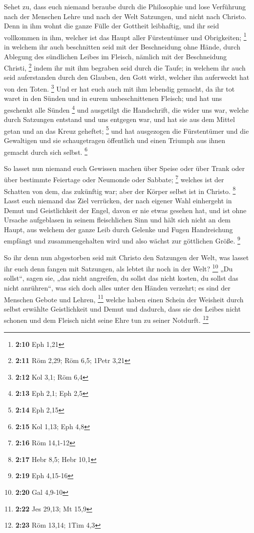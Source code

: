  Sehet zu, dass euch niemand beraube durch die Philosophie
und lose Verführung nach der Menschen Lehre und nach der Welt Satzungen,
und nicht nach Christo.  Denn in ihm wohnt die ganze Fülle
der Gottheit leibhaftig,  und ihr seid vollkommen in ihm,
welcher ist das Haupt aller Fürstentümer und Obrigkeiten; \footnote{\textbf{2:10}
  Eph 1,21}  in welchem ihr auch beschnitten seid mit der
Beschneidung ohne Hände, durch Ablegung des sündlichen Leibes im
Fleisch, nämlich mit der Beschneidung Christi, \footnote{\textbf{2:11}
  Röm 2,29; Röm 6,5; 1Petr 3,21}  indem ihr mit ihm
begraben seid durch die Taufe; in welchem ihr auch seid auferstanden
durch den Glauben, den Gott wirkt, welcher ihn auferweckt hat von den
Toten. \footnote{\textbf{2:12} Kol 3,1; Röm 6,4}  Und er
hat euch auch mit ihm lebendig gemacht, da ihr tot waret in den Sünden
und in eurem unbeschnittenen Fleisch; und hat uns geschenkt alle Sünden
\footnote{\textbf{2:13} Eph 2,1; Eph 2,5}  und ausgetilgt
die Handschrift, die wider uns war, welche durch Satzungen entstand und
uns entgegen war, und hat sie aus dem Mittel getan und an das Kreuz
geheftet; \footnote{\textbf{2:14} Eph 2,15}  und hat
ausgezogen die Fürstentümer und die Gewaltigen und sie schaugetragen
öffentlich und einen Triumph aus ihnen gemacht durch sich selbst.
\footnote{\textbf{2:15} Kol 1,13; Eph 4,8}

 So lasset nun niemand euch Gewissen machen über Speise
oder über Trank oder über bestimmte Feiertage oder Neumonde oder
Sabbate; \footnote{\textbf{2:16} Röm 14,1-12}  welches
ist der Schatten von dem, das zukünftig war; aber der Körper selbst ist
in Christo. \footnote{\textbf{2:17} Hebr 8,5; Hebr 10,1} 
Lasst euch niemand das Ziel verrücken, der nach eigener Wahl einhergeht
in Demut und Geistlichkeit der Engel, davon er nie etwas gesehen hat,
und ist ohne Ursache aufgeblasen in seinem fleischlichen Sinn
 und hält sich nicht an dem Haupt, aus welchem der ganze
Leib durch Gelenke und Fugen Handreichung empfängt und zusammengehalten
wird und also wächst zur göttlichen Größe. \footnote{\textbf{2:19} Eph
  4,15-16}

 So ihr denn nun abgestorben seid mit Christo den
Satzungen der Welt, was lasset ihr euch denn fangen mit Satzungen, als
lebtet ihr noch in der Welt? \footnote{\textbf{2:20} Gal 4,9-10}
 „Du sollst``, sagen sie, „das nicht angreifen, du sollst
das nicht kosten, du sollst das nicht anrühren``,  was
sich doch alles unter den Händen verzehrt; es sind der Menschen Gebote
und Lehren, \footnote{\textbf{2:22} Jes 29,13; Mt 15,9} 
welche haben einen Schein der Weisheit durch selbst erwählte
Geistlichkeit und Demut und dadurch, dass sie des Leibes nicht schonen
und dem Fleisch nicht seine Ehre tun zu seiner Notdurft. \footnote{\textbf{2:23}
  Röm 13,14; 1Tim 4,3}

